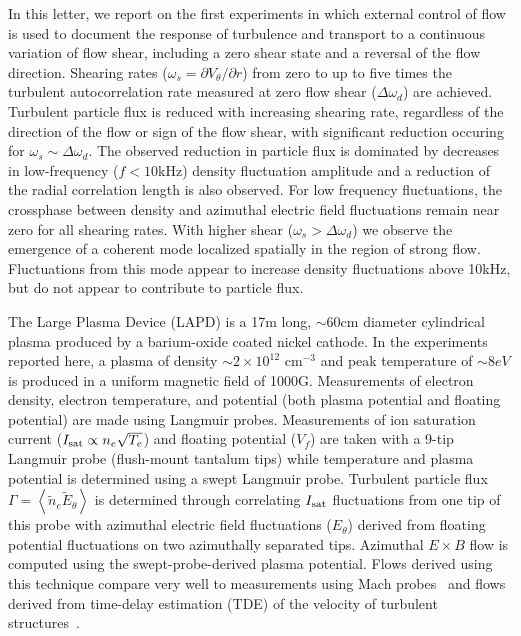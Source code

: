 \documentclass[aps,prl,amsmath,amssymb,preprint,superscriptaddress]{revtex4}
\begin{document}
In this letter, we report on the first experiments in which external control of flow is used to document the response of turbulence and transport to a continuous variation of flow shear, including a zero shear state and a reversal of the flow direction. Shearing rates ($\omega_{s}= \partial V_{\theta}/\partial r$) from
zero to up to five times the turbulent autocorrelation rate measured at zero flow shear ($\Delta \omega_{d}$) are achieved. Turbulent particle flux is reduced with increasing shearing rate, regardless of the direction of the flow or sign of the flow shear, with significant reduction occuring for $\omega_s \sim \Delta \omega_d$.  The observed reduction in particle flux is dominated by decreases in low-frequency ($f < 10$kHz) density fluctuation amplitude and a reduction of the
radial correlation length is also observed. For low frequency fluctuations, the crossphase between density and azimuthal electric field fluctuations remain near
zero for all shearing rates.  With higher shear ($\omega_s > \Delta \omega_d$) we observe the emergence of a coherent mode localized spatially in the region
of strong flow. Fluctuations from this mode appear to increase density fluctuations above 10kHz, but do not appear to contribute to particle flux.   

The Large Plasma Device \cite{gek91} (LAPD) is a 17m long, $\sim 60$cm
diameter cylindrical plasma produced by a barium-oxide coated nickel
cathode. In the experiments reported here, a plasma of density $\sim 2
\times 10^{12}$ cm$^{-3}$ and peak temperature of $\sim 8 eV$ is
produced in a uniform magnetic field of 1000G.  Measurements of 
electron density, electron temperature, and potential (both plasma
potential and floating potential) are made using Langmuir probes.  
Measurements of ion saturation current ($I_{\rm sat} \propto n_e \sqrt{T_e}$) and floating
potential ($V_f$) are taken with a 9-tip Langmuir probe (flush-mount
tantalum tips) while temperature and plasma potential is
determined using a swept Langmuir probe. Turbulent particle flux
$\Gamma = \left<\tilde{n}_e \tilde{E}_\theta\right>$ is
determined through correlating $I_{\rm sat}$ fluctuations from one tip
of this probe with
azimuthal electric field fluctuations ($E_\theta$) derived from
floating potential fluctuations on two azimuthally separated tips.
Azimuthal $E\times B$ flow is computed
using the swept-probe-derived plasma potential.  Flows derived using
this technique compare very well to measurements using
Mach probes~\cite{maggs07} and flows derived from time-delay
estimation (TDE) of the velocity of turbulent structures~\cite{holland04}.
  
\end{document}
